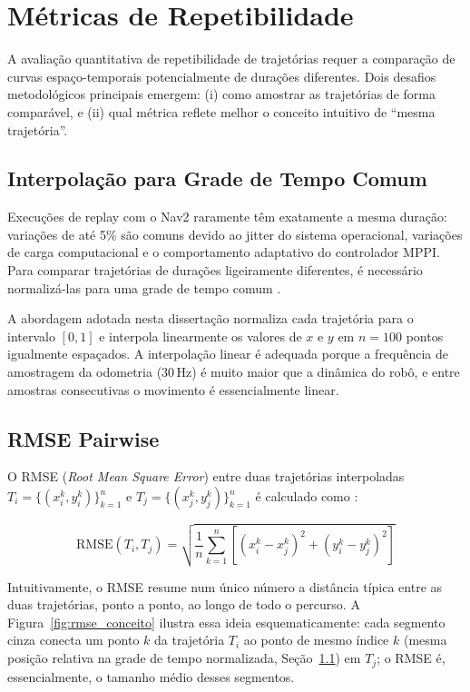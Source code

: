 \section{Métricas de Repetibilidade}
\label{sec:metricas_teoricas}

A avaliação quantitativa de repetibilidade de trajetórias requer a comparação de
curvas espaço-temporais potencialmente de durações diferentes. Dois desafios
metodológicos principais emergem: (i) como amostrar as trajetórias de forma
comparável, e (ii) qual métrica reflete melhor o conceito intuitivo de ``mesma
trajetória''.

\subsection{Interpolação para Grade de Tempo Comum}
\label{sec:interpolacao}

Execuções de replay com o Nav2 raramente têm exatamente a mesma duração: variações
de até 5\% são comuns devido ao jitter do sistema operacional, variações de carga
computacional e o comportamento adaptativo do controlador MPPI. Para comparar
trajetórias de durações ligeiramente diferentes, é necessário normalizá-las para
uma grade de tempo comum \cite{amigoni2010, zhang2018trajectory}.

A abordagem adotada nesta dissertação normaliza cada trajetória para o intervalo
$[0, 1]$ e interpola linearmente os valores de $x$ e $y$ em $n = 100$ pontos
igualmente espaçados. A interpolação linear é adequada porque a frequência de
amostragem da odometria (30\,Hz) é muito maior que a dinâmica do robô, e entre
amostras consecutivas o movimento é essencialmente linear.

\subsection{RMSE Pairwise}
\label{sec:rmse_pairwise}

O RMSE (\textit{Root Mean Square Error}) entre duas trajetórias interpoladas
$T_i = \{(x_i^k, y_i^k)\}_{k=1}^{n}$ e $T_j = \{(x_j^k, y_j^k)\}_{k=1}^{n}$
é calculado como \cite{sturm2012, maset2022}:

\begin{equation}
\text{RMSE}(T_i, T_j) = \sqrt{\frac{1}{n} \sum_{k=1}^{n}
\left[(x_i^k - x_j^k)^2 + (y_i^k - y_j^k)^2 \right]}
\label{eq:rmse_pairwise}
\end{equation}

Intuitivamente, o RMSE resume num único número a distância típica entre as
duas trajetórias, ponto a ponto, ao longo de todo o percurso. A
Figura~\ref{fig:rmse_conceito} ilustra essa ideia esquematicamente: cada
segmento cinza conecta um ponto $k$ da trajetória $T_i$ ao ponto de mesmo
índice $k$ (mesma posição relativa na grade de tempo normalizada, Seção~\ref{sec:interpolacao})
em $T_j$; o RMSE é, essencialmente, o tamanho médio desses segmentos.

